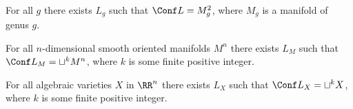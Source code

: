 \documentclass[11pt]{scrartcl}
\begin{document}
  \begin{theorem}
    For all $g$ there exists $L_{g}$ such that $\Conf L = M_{g}^{2}$,
    where $M_{g}$ is a manifold of genus $g$.
  \end{theorem}

  \begin{theorem}
    For all $n$-dimensional smooth oriented manifolds $M^{n}$ there
    exists $L_{M}$ such that $\Conf L_{M} = \sqcup^{k} M^{n}$, where
    $k$ is some finite positive integer.
  \end{theorem}

  \begin{theorem}
    For all algebraic varieties $X$ in $\RR^{n}$ there exists $L_{X}$
    such that $\Conf L_{X} = \sqcup ^{k} X$, where $k$ is some
    finite positive integer.
  \end{theorem}

  
\end{document}
